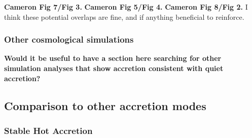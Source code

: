 \documentclass[fleqn,usenatbib]{mnras}
\begin{document}
\textbf{Cameron Fig 7/Fig 3.}
\textbf{Cameron Fig 5/Fig 4.}
\textbf{Cameron Fig 8/Fig 2.}
I think these potential overlaps are fine, and if anything beneficial to reinforce.

\subsubsection{Other cosmological simulations}
\label{s: broader prevalance -- other sims}

\textbf{
Would it be useful to have a section here searching for other simulation analyses that show accretion consistent with quiet accretion?
}


\subsection{Comparison to other accretion modes}
\label{s: modes}

\subsubsection{Stable Hot Accretion}
\label{s: modes -- hot}
\end{document}
